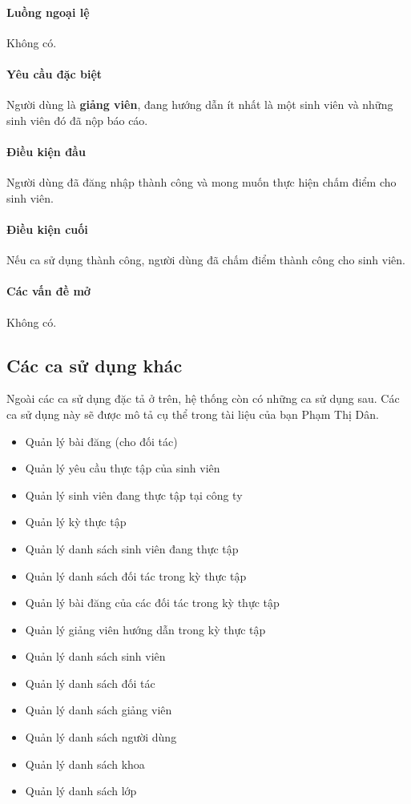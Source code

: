 \documentclass[./../main.tex]{subfiles}
\begin{document}
\paragraph*{Luồng ngoại lệ} Không có.

\paragraph*{Yêu cầu đặc biệt}

Người dùng là \textbf{giảng viên}, đang hướng dẫn ít nhất là một sinh viên và những sinh viên đó đã nộp báo cáo.

\paragraph*{Điều kiện đầu}

Người dùng đã đăng nhập thành công và mong muốn thực hiện chấm điểm cho sinh viên.

\paragraph*{Điều kiện cuối}

Nếu ca sử dụng thành công, người dùng đã chấm điểm thành công cho sinh viên.

\paragraph*{Các vấn đề mở}

Không có.


\subsection{Các ca sử dụng khác}

Ngoài các ca sử dụng đặc tả ở trên, hệ thống còn có những ca sử dụng sau. Các ca sử dụng này sẽ được mô tả cụ thể trong tài liệu của bạn Phạm Thị Dân.

\begin{itemize}
	\item Quản lý bài đăng (cho đối tác)
	\item Quản lý yêu cầu thực tập của sinh viên
	\item Quản lý sinh viên đang thực tập tại công ty
	\item Quản lý kỳ thực tập
	\item Quản lý danh sách sinh viên đang thực tập
	\item Quản lý danh sách đối tác trong kỳ thực tập
	\item Quản lý bài đăng của các đối tác trong kỳ thực tập
	\item Quản lý giảng viên hướng dẫn trong kỳ thực tập
	\item Quản lý danh sách sinh viên
	\item Quản lý danh sách đối tác
	\item Quản lý danh sách giảng viên
	\item Quản lý danh sách người dùng
	\item Quản lý danh sách khoa
	\item Quản lý danh sách lớp
\end{itemize}
\end{document}
